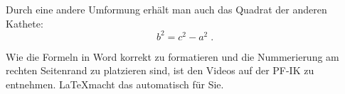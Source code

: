 Durch eine andere Umformung erhält man auch das Quadrat der anderen Kathete:
\begin{equation}
b^2=c^2-a^2\;.
\end{equation}

Wie die Formeln in Word korrekt zu formatieren und die Nummerierung am rechten Seitenrand zu platzieren sind, ist den Videos auf der PF-IK zu entnehmen. \LaTeX macht das automatisch für Sie.
